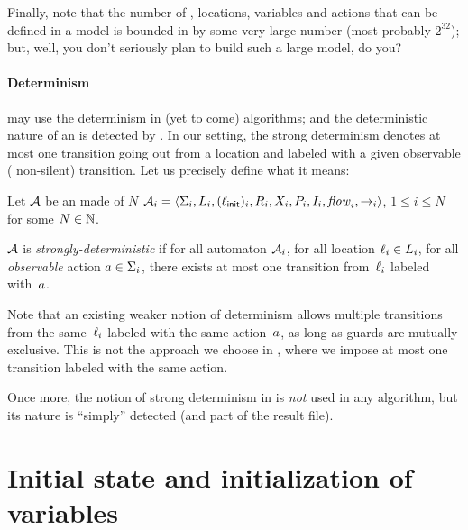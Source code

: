 
Finally, note that the number of \IPTA{}, locations, variables and actions that can be defined in a model is bounded in \imitator{} by some very large number (most probably $2^{32}$); but, well, you don't seriously plan to build such a large model, do you?


\paragraph{Determinism}
\imitator{} may use the determinism in (yet to come) algorithms; and the deterministic nature of an \NIPTA{} is detected by \imitator{}.
In our setting, the strong determinism denotes at most one transition going out from a location and labeled with a given observable (\ie{} non-silent) transition.
Let us precisely define what it means:

\begin{definition}
	Let $\mathcal{A}$ be an \NIPTA{} made of $N$ \IPTA{} $\mathcal{A}_i = \langle\Sigma_i, L_i, (\ell_{\textsf{init}})_i, R_i, X_i, P_i, I_i, \mathit{flow}_i, {\rightarrow}_i\rangle$, $1 \leq i \leq N$ for some $N \in \mathbb N$.

	$\mathcal{A}$ is \emph{strongly-deterministic} if
	for all automaton $\mathcal{A}_i$,
	for all location $\ell_i \in L_i$,
	for all \emph{observable} action $a \in \Sigma_i$,
	there exists at most one transition from~$\ell_i$ labeled with~$a$.
\end{definition}

Note that an existing weaker notion of determinism allows multiple transitions from the same~$\ell_i$ labeled with the same action~$a$, as long as guards are mutually exclusive.
This is not the approach we choose in \imitator{}, where we impose at most one transition labeled with the same action.

Once more, the notion of strong determinism in \imitator{} is \emph{not} used in any algorithm, but its nature is ``simply'' detected (and part of the result file).


\section{Initial state and initialization of variables}\label{section:init}

